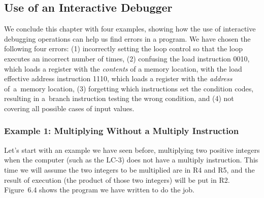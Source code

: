\documentclass{patt}
\begin{document}
\subsection{Use of an Interactive Debugger}

We conclude this chapter with four examples, showing how the use of
interactive debugging operations can help us find errors in a
program.  We have chosen the following four errors: (1) incorrectly
setting the loop control so that the loop executes an incorrect number
of times, (2) confusing the load instruction 0010, which loads a
register with the {\em contents} of a memory location, with the load
effective address instruction 1110, which loads a register with the
{\em address} of~a~memory location, (3) forgetting which instructions set
the condition codes, resulting in a~branch instruction testing the
wrong condition, and (4) not covering all possible cases of input
values.

\subsubsection{Example 1: Multiplying Without a Multiply Instruction}

Let's start with an example we have seen before, multiplying two 
positive integers when the computer (such as the LC-3) does not have 
a multiply instruction.  This time we will assume the two integers to be 
multiplied are in R4 and R5,
and the result of execution (the product of those two integers) will be
put in R2.  Figure~6.4 shows the program we have written to do the job. 
\end{document}
